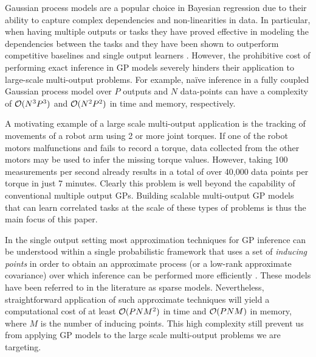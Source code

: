 Gaussian process models  \citep[GPs,][]{rasmussen-williams-book}  are a popular choice in 
Bayesian regression due to their ability to capture complex dependencies and non-linearities in data.
In particular, when having multiple outputs or tasks they have proved effective in modeling 
the dependencies between the tasks  and  they have been shown to outperform competitive baselines and 
single output learners  \citep{bonilla-et-al-nips-08,teh-et-al-aistats-05,alvarez-lawrence-nips-08,wilson-et-al-icml-12}.
However, the prohibitive cost of performing exact inference in  GP models severely hinders 
their application to  large-scale multi-output problems. For example, na\"{i}ve inference 
in a fully coupled Gaussian process model over $P$  outputs and $N$ data-points can have 
a complexity of $\mathcal{O}(N^3P^3)$  and $\mathcal{O}(N^2P^2)$ in time and memory, respectively.


A motivating  example of a large scale multi-output application 
is the tracking of  movements of a robot arm using 2 or more joint torques. 
If one of the robot motors malfunctions and fails to record a torque, data collected from the 
other motors may be used to infer the missing torque values.
However, taking 100 measurements per second already results in a total of over 40,000 data points 
per torque in just 7 minutes.
Clearly this problem is well beyond the capability of conventional multiple output GPs.
Building scalable multi-output GP models that can learn correlated tasks at the scale of 
these types of problems  is thus the main focus of this paper.

In the single output setting most approximation techniques for GP inference can be understood 
within a single probabilistic framework that uses a set of \emph{inducing points}  in order to 
obtain an approximate process (or a low-rank approximate covariance) over which inference can be 
performed more efficiently \citep{quinonero2005unifying}. These models have been referred 
to in the literature as sparse models. 
Nevertheless, straightforward application of such approximate techniques will yield a computational 
cost of at least $\mathcal{O}(PNM^2)$ in time and  $\mathcal{O}(PNM)$ in memory, where 
$M$ is the number of inducing points. This high complexity still prevent us from applying GP models 
to the large scale multi-output problems we are targeting.


